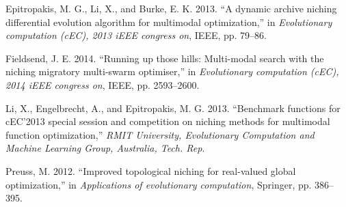 \documentclass[12pt,a4paper]{article}
\begin{document}
\hypertarget{refs}{}
\hypertarget{ref-epitropakisux5f2013}{}
Epitropakis, M. G., Li, X., and Burke, E. K. 2013. ``A dynamic archive
niching differential evolution algorithm for multimodal optimization,''
in \emph{Evolutionary computation (cEC), 2013 iEEE congress on}, IEEE,
pp. 79--86.

\hypertarget{ref-fieldsendux5f2014}{}
Fieldsend, J. E. 2014. ``Running up those hills: Multi-modal search with
the niching migratory multi-swarm optimiser,'' in \emph{Evolutionary
computation (cEC), 2014 iEEE congress on}, IEEE, pp. 2593--2600.

\hypertarget{ref-liux5f2013}{}
Li, X., Engelbrecht, A., and Epitropakis, M. G. 2013. ``Benchmark
functions for cEC'2013 special session and competition on niching
methods for multimodal function optimization,'' \emph{RMIT University,
Evolutionary Computation and Machine Learning Group, Australia, Tech.
Rep}.

\hypertarget{ref-preussux5f2012}{}
Preuss, M. 2012. ``Improved topological niching for real-valued global
optimization,'' in \emph{Applications of evolutionary computation},
Springer, pp. 386--395.
\end{document}
